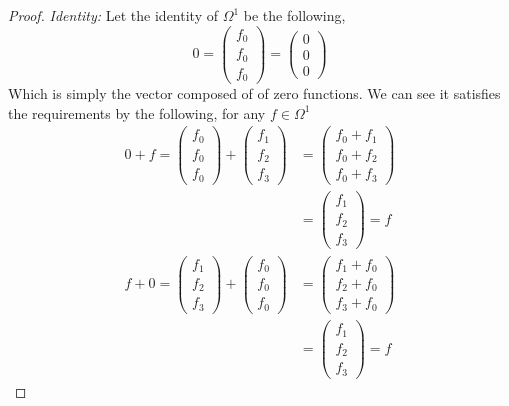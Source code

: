 \documentclass[12pt]{article}
\begin{document}
\begin{itemize}
\begin{itemize}
\begin{proof}
                \textit{Identity:} Let the identity of $\Omega^1$ be the following,
                \[0 = \begin{pmatrix}
                    f_0 \\f_0\\f_0
                \end{pmatrix} = \begin{pmatrix}
                    0\\0\\0
                \end{pmatrix}\] 
                \newpage
                Which is simply the vector composed of of zero functions. We can see it satisfies the requirements by the following, for any $f\in \Omega^1 $
                \begin{align*}
                    0 + f =\begin{pmatrix}
                        f_0 \\f_0 \\ f_0
                    \end{pmatrix} + \begin{pmatrix}
                        f_1 \\ f_2 \\f_3
                    \end{pmatrix} &= \begin{pmatrix}
                        f_0 + f_1 \\ f_0 + f_2 \\ f_0 + f_3
                    \end{pmatrix} \\
                    &= \begin{pmatrix}
                        f_1 \\ f_2\\ f_3
                    \end{pmatrix} = f \\
                    f+ 0 = \begin{pmatrix}
                        f_1 \\ f_2 \\f_3
                    \end{pmatrix} + \begin{pmatrix}
                        f_0 \\f_0 \\ f_0
                    \end{pmatrix} &=  \begin{pmatrix}
                        f_1 + f_0 \\ f_2 + f_0 \\ f_3 + f_0
                    \end{pmatrix} \\
                    &= \begin{pmatrix}
                        f_1 \\ f_2\\ f_3
                    \end{pmatrix} = f
                \end{align*}


\end{proof}
\end{itemize}
\end{itemize}
\end{document}
